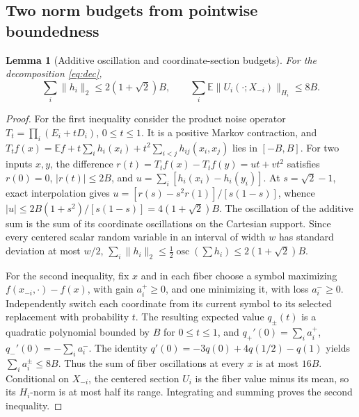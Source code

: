 \documentclass[11pt,letterpaper]{article}
\newtheorem{lemma}[theorem]{Lemma}
\theoremstyle{definition}\newtheorem{definition}[theorem]{Definition}
\newcommand{\E}{\mathbb E}
\newcommand{\osc}{\operatorname{osc}}
\newcommand{\abs}[1]{\lvert #1\rvert}
\newcommand{\norm}[1]{\lVert #1\rVert}
\begin{document}
\subsection{Two norm budgets from pointwise boundedness}
\begin{lemma}[Additive oscillation and coordinate-section budgets]\label{lem:budgets}
For the decomposition \eqref{eq:dec},
\begin{equation}\label{eq:budgets}
\sum_i\norm{h_i}_2\le 2(1+\sqrt2)B,\qquad
\sum_i\E\norm{U_i(\cdot;X_{-i})}_{H_i}\le8B.
\end{equation}
\end{lemma}
\begin{proof}
For the first inequality consider the product noise operator $T_t=\prod_i(E_i+tD_i)$, $0\le t\le1$. It is a positive Markov contraction, and
$T_t f(x)=\E f+t\sum_i h_i(x_i)+t^2\sum_{i<j}h_{ij}(x_i,x_j)$ lies in $[-B,B]$.
For two inputs $x,y$, the difference $r(t)=T_tf(x)-T_tf(y)=ut+vt^2$ satisfies $r(0)=0$, $\abs{r(t)}\le2B$, and $u=\sum_i[h_i(x_i)-h_i(y_i)]$. At $s=\sqrt2-1$, exact interpolation gives
$u=[r(s)-s^2r(1)]/[s(1-s)]$, whence $\abs u\le2B(1+s^2)/[s(1-s)]=4(1+\sqrt2)B$.
The oscillation of the additive sum is the sum of its coordinate oscillations on the Cartesian support. Since every centered scalar random variable in an interval of width $w$ has standard deviation at most $w/2$, $\sum_i\norm{h_i}_2\le\frac12\osc(\sum h_i)\le2(1+\sqrt2)B$.

For the second inequality, fix $x$ and in each fiber choose a symbol maximizing $f(x_{-i},\cdot)-f(x)$, with gain $a_i^+\ge0$, and one minimizing it, with loss $a_i^-\ge0$. Independently switch each coordinate from its current symbol to its selected replacement with probability $t$. The resulting expected value $q_\pm(t)$ is a quadratic polynomial bounded by $B$ for $0\le t\le1$, and $q_+'(0)=\sum_i a_i^+$, $q_-'(0)=-\sum_i a_i^-$. The identity $q'(0)=-3q(0)+4q(1/2)-q(1)$ yields $\sum_i a_i^\pm\le8B$. Thus the sum of fiber oscillations at every $x$ is at most $16B$. Conditional on $X_{-i}$, the centered section $U_i$ is the fiber value minus its mean, so its $H_i$-norm is at most half its range. Integrating and summing proves the second inequality.
\end{proof}
\end{document}
